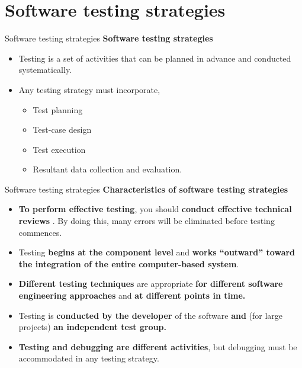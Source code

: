 \documentclass{beamer}
\begin{document}
\section{Software testing strategies}
\begin{frame}{Software testing strategies}
\textbf{Software testing strategies}
\begin{itemize}
	\item Testing is a set of activities that can be planned in advance and conducted systematically.
	\item Any testing strategy must incorporate,
	\begin{itemize}
		\item Test planning
		\item Test-case design
		\item Test execution
		\item Resultant data collection and evaluation.
	\end{itemize}
\end{itemize}
\end{frame}
\begin{frame}{Software testing strategies}
	\textbf{Characteristics of software testing strategies}
	\begin{itemize}
		\item \textbf{To perform effective testing}, you should \textbf{conduct effective technical reviews} . By doing 
		this, many errors will be eliminated before testing commences.
		\item Testing \textbf{begins at the component level} and \textbf{works “outward” toward the integration of the 
			entire computer-based system}.
		\item \textbf{Different testing techniques} are appropriate \textbf{for different software engineering approaches }
		and \textbf{at different points in time.}
		\item Testing is \textbf{conducted by the developer} of the software \textbf{and} (for large projects) \textbf{an independent test group.}
		\item \textbf{Testing and debugging are different activities}, but debugging must be accommodated in 
		any testing strategy.
	\end{itemize}
\end{frame}
\end{document}
